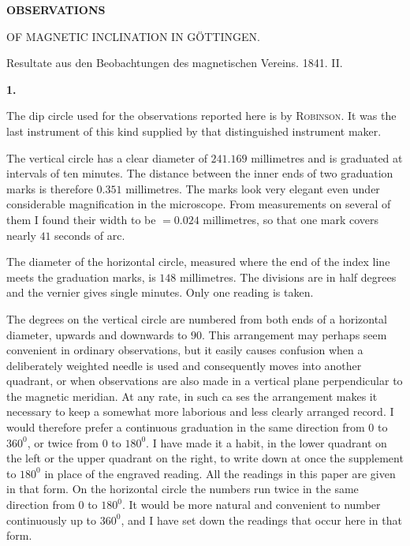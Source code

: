 \clearpage
{}
\begin{center}
{\Large\bfseries OBSERVATIONS\par\medskip OF MAGNETIC INCLINATION IN GÖTTINGEN.}
\par\bigskip
Resultate aus den Beobachtungen des magnetischen Vereins. 1841. II.
\end{center}
\begingroup
\renewcommand{\Article}[1]{\par\medskip\Needspace{4\baselineskip}\pdfbookmark[1]{#1.}{inclination-observations-art-#1}\centerline{\textbf{#1.}}\nobreak\smallskip}%
\Article{1}
The dip circle used for the observations reported here is by \textsc{Robinson}. It was the last instrument of this kind supplied by that distinguished instrument maker.

The vertical circle has a clear diameter of $241.169$ millimetres and is graduated at intervals of ten minutes. The distance between the inner ends of two graduation marks is therefore $0.351$ millimetres. The marks look very elegant even under considerable magnification in the microscope. From measurements on several of them I found their width to be $=0.024$ millimetres, so that one mark covers nearly $41$ seconds of arc.

The diameter of the horizontal circle, measured where the end of the index line meets the graduation marks, is $148$ millimetres. The divisions are in half degrees and the vernier gives single minutes. Only one reading is taken.

The degrees on the vertical circle are numbered from both ends of a horizontal diameter, upwards and downwards to $90$. This arrangement may perhaps seem convenient in ordinary observations, but it easily causes confusion when a deliberately weighted needle is used and consequently moves into another quadrant, or when observations are also made in a vertical plane perpendicular to the magnetic meridian. At any rate, in such ca%
%
ses the arrangement makes it necessary to keep a somewhat more laborious and less clearly arranged record. I would therefore prefer a continuous graduation in the same direction from $0$ to $360^0$, or twice from $0$ to $180^0$. I have made it a habit, in the lower quadrant on the left or the upper quadrant on the right, to write down at once the supplement to $180^0$ in place of the engraved reading. All the readings in this paper are given in that form. On the horizontal circle the numbers run twice in the same direction from $0$ to $180^0$. It would be more natural and convenient to number continuously up to $360^0$, and I have set down the readings that occur here in that form.


